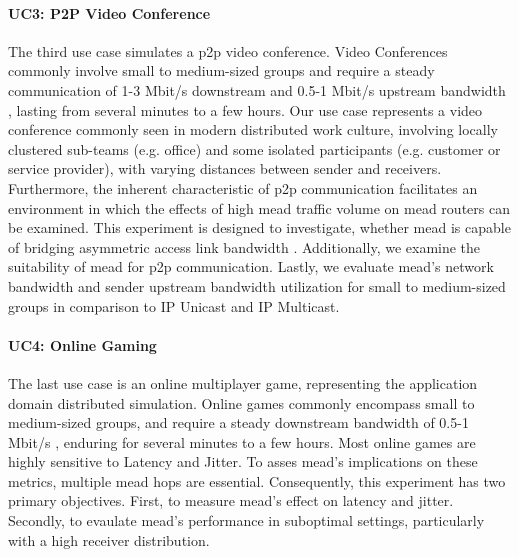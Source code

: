 \paragraph{UC3: P2P Video Conference} %
\label{par:EX3 Video conference}
The third use case simulates a \gls{p2p} video conference.
Video Conferences commonly involve small to medium-sized groups and require a
    steady communication of 1-3 Mbit/s downstream and 0.5-1 Mbit/s upstream
    bandwidth \cite{cartesian_us_bw}, lasting from several minutes to a few hours.
Our use case represents a video conference commonly  seen in modern distributed
    work culture, involving locally clustered sub-teams (e.g. office) and some
    isolated participants (e.g. customer or service provider), with varying
    distances between sender and receivers.
Furthermore, the inherent characteristic of \gls{p2p} communication facilitates
    an environment in which the effects of high \gls{mead} traffic volume on
    \gls{mead} routers can be examined.
This experiment is designed to investigate, whether \gls{mead} is capable of
    bridging asymmetric access link bandwidth \cite{xcast_rfc,cartesian_us_bw}.
Additionally, we examine the suitability of \gls{mead} for \gls{p2p}
    communication.
Lastly, we evaluate \gls{mead}'s network bandwidth and sender upstream
    bandwidth utilization for small to medium-sized groups in comparison to IP
    Unicast and IP Multicast.

\paragraph{UC4: Online Gaming} %
\label{par:EX4 Online game}
The last use case is an online multiplayer game, representing the application
    domain distributed simulation.
Online games commonly encompass small to medium-sized groups, and require a
    steady downstream bandwidth of 0.5-1 Mbit/s \cite{cartesian_us_bw},
    enduring for several minutes to a few hours.
Most online games are highly sensitive to Latency and Jitter.
To asses \gls{mead}'s implications on these metrics, multiple \gls{mead}
    hops are essential.
Consequently, this experiment has two primary objectives.
First, to measure \gls{mead}'s effect on latency and jitter.
Secondly, to evaulate \gls{mead}'s performance in suboptimal settings,
    particularly with a high receiver distribution.

